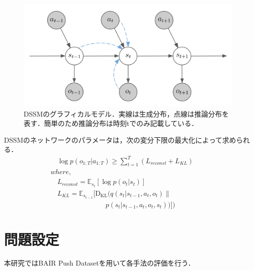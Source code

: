 \documentclass[10pt, twocolumn]{jarticle}
\begin{document}
\begin{figure}[h]
    \begin{center}
      \includegraphics[width=0.8\linewidth]{./figures/dssm.png}
      \caption[DSSMのグラフィカルモデル]{\small DSSMのグラフィカルモデル．実線は生成分布，点線は推論分布を表す．簡単のため推論分布は時刻tでのみ記載している．}
      \label{fig:ssm}
    \end{center}
  \end{figure}

DSSMのネットワークのパラメータは，次の変分下限の最大化によって求められる．
  \small
  \begin{eqnarray}
    && \hspace{1em} \log p(o_{1:T}|a_{1:T}) \geq \sum_{t=1}^T ( {L}_{reconst} + {L}_{KL})  \\
    && where,  \nonumber \\
    && \hspace{1em} {L}_{reconst} = \mathbb{E}_{s_t} [\log p(o_t|s_t)] \nonumber \\
    && \hspace{1em} {L}_{KL} = \mathbb{E}_{s_{t-1}} [\mathrm{D_{KL}}(q(s_t|s_{t-1}, a_t, o_t) \| \nonumber \\
    && \hspace{8em} p(s_t|s_{t-1}, a_t, o_t, s_t))] ) \hspace{6em} \nonumber
    \label{eq:dssm_elbo}  
  \end{eqnarray}
\normalsize

\section{問題設定}
本研究ではBAIR Push Dataset\cite{ebert2017selfsupervised}を用いて各手法の評価を行う．
\end{document}
